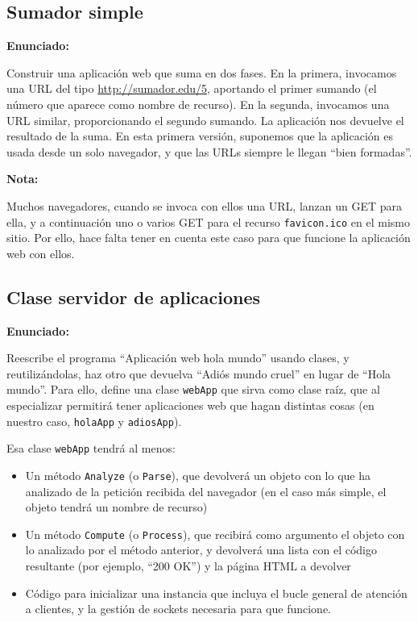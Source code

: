 \subsection{Sumador simple}
\label{subsec:sumador-simple}

\textbf{Enunciado:}

Construir una aplicación web que suma en dos fases. En la primera, invocamos una URL del tipo \url{http://sumador.edu/5}, aportando el primer sumando (el número que aparece como nombre de recurso). En la segunda, invocamos una URL similar, proporcionando el segundo sumando. La aplicación nos devuelve el resultado de la suma. En esta primera versión, suponemos que la aplicación es usada desde un solo navegador, y que las URLs siempre le llegan ``bien formadas''.

\textbf{Nota:}

Muchos navegadores, cuando se invoca con ellos una URL, lanzan un GET para ella, y a continuación uno o varios GET para el recurso \texttt{favicon.ico} en el mismo sitio. Por ello, hace falta tener en cuenta este caso para que funcione la aplicación web con ellos.

\subsection{Clase servidor de aplicaciones}
\label{subsec:clase-serv-aplis}

\textbf{Enunciado:}

Reescribe el programa ``Aplicación web hola mundo'' usando clases, y reutilizándolas, haz otro que devuelva ``Adiós mundo cruel'' en lugar de ``Hola mundo''. Para ello, define una clase \texttt{webApp} que sirva como clase raíz, que al especializar permitirá tener aplicaciones web que hagan distintas cosas (en nuestro caso, \texttt{holaApp} y \texttt{adiosApp}).

Esa clase \texttt{webApp} tendrá al menos:

\begin{itemize}
\item Un método \texttt{Analyze} (o \texttt{Parse}), que devolverá un objeto con lo que ha analizado de la petición recibida del navegador (en el caso más simple, el objeto tendrá un nombre de recurso)
\item Un método \texttt{Compute} (o \texttt{Process}), que recibirá como argumento el objeto con lo analizado por el método anterior, y devolverá una lista con el código resultante (por ejemplo, ``200 OK'') y la página HTML a devolver
\item Código para inicializar una instancia que incluya el bucle general de atención a clientes, y la gestión de sockets necesaria para que funcione.
\end{itemize}

